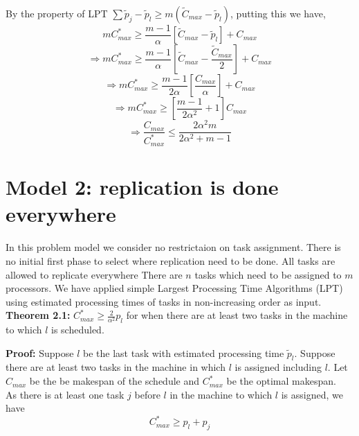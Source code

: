 \documentclass[10pt, conference, compsocconf]{IEEEtran}
\begin{document}
By the property of LPT $\sum \tilde p_j-\tilde p_l \geq m (\tilde C_{max}-\tilde p_l)$, putting this we have,\\
\begin{equation}\nonumber 
 m C_{max}^{*}\geq \frac{m-1}{\alpha } [\tilde C_{max}-\tilde p_l] + {C_{max}}
 \end{equation}
\begin{equation}\nonumber
\Rightarrow m C_{max}^{*}\geq \frac{m-1}{\alpha } [\tilde C_{max}-\frac{\tilde C_{max}}{2}] + {C_{max}}
\end{equation}
\begin{equation}\nonumber
\Rightarrow m C_{max}^{*}\geq \frac{m-1}{2\alpha } [\frac{C_{max}} {\alpha} ]+ {C_{max}}
\end{equation}
\begin{equation}\nonumber
\Rightarrow m C_{max}^{*}\geq[\frac{m-1}{2\alpha^{2} } +1]{C_{max}}
\end{equation}
\begin{equation}\nonumber
\Rightarrow \frac{C_{max}}{C_{max}^{*}}\leq \frac{2\alpha^{2}m}{2\alpha^{2}+ m-1}
\end{equation}



\section{Model 2: replication is done everywhere}
In this problem model we consider no restrictaion on task assignment.  There is no initial first phase to select where replication need to be done.  All tasks are allowed to replicate everywhere There are $ n$ tasks which need to be  assigned to $m$ processors. We have applied simple Largest Processing Time Algorithms (LPT) using estimated processing times of tasks in non-increasing order as input.  \\




\textbf{Theorem 2.1:} $C_{max}^{*} \geq {\frac{2}{\alpha^{2}}} p_l $ for when there are at least two tasks in the machine to which $l$ is scheduled.

\textbf{Proof:} Suppose $l$ be the last task with estimated processing time $\tilde p_l$. Suppose
there are at least two tasks in the machine in which $l$ is assigned including $l$. Let
$C_{max}$ be the be makespan of the schedule and $C_{max}^{*}$ be the optimal makespan.\\

As there is at least one task $j$ before $l$ in the machine to which $l$ is
assigned, we have
\begin{equation}\nonumber
C_{max}^{*}\geq p_l + p_j
\end{equation}
\end{document}
